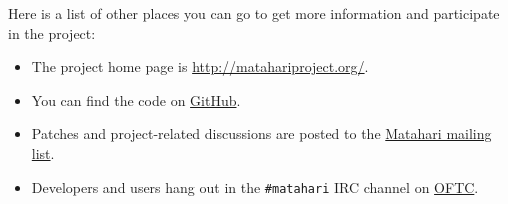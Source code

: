 \documentclass{tufte-handout}
\begin{document}
Here is a list of other places you can go to get more information and participate in the project:

\begin{itemize}
\item The project home page is \url{http://matahariproject.org/}.
\item You can find the code on \href{https://github.com/matahari/matahari}{GitHub}.
\item Patches and project-related discussions are posted to the \href{https://fedorahosted.org/mailman/listinfo/matahari}{Matahari mailing list}.
\item Developers and users hang out in the \texttt{\#matahari} IRC channel on \href{http://www.oftc.net/}{OFTC}.
\end{itemize}
\end{document}
